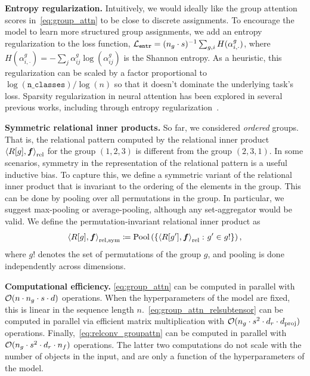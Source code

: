 \textbf{Entropy regularization.} Intuitively, we would ideally like the group attention scores in~\cref{eq:group_attn} to be close to discrete assignments. 
To encourage the model to learn more structured group assignments, we add an entropy regularization to the loss function, ${\mathcal{L}}_{\mathtt{entr}} = (n_g \cdot s)^{-1} \sum_{g, i} H(\alpha_{i,\cdot}^{g})$, where $H(\alpha_{i,\cdot}^{g}) = - \sum_{j} \alpha_{ij}^{g} \log(\alpha_{ij}^g)$ is the Shannon entropy. As a heuristic, this regularization can be scaled by a factor proportional to $\log(\mathtt{n\_classes}) / \log(n)$ so that it doesn't dominate the underlying task's loss. Sparsity regularization in neural attention has been explored in several previous works, including through entropy regularization~\citep[e.g.,][]{niculae2017regularized,martins2020sparse,attanasio2022entropy}.

\textbf{Symmetric relational inner products.} So far, we considered \textit{ordered} groups. That is, the relational pattern computed by the relational inner product $\left\langle R[g], \bm{f} \right\rangle_\mathrm{rel}$ for the group $(1, 2, 3)$ is different from the group $(2, 3, 1)$. In some scenarios, symmetry in the representation of the relational pattern is a useful inductive bias. To capture this, we define a symmetric variant of the relational inner product that is invariant to the ordering of the elements in the group. This can be done by pooling over all permutations in the group. In particular, we suggest max-pooling or average-pooling, although any set-aggregator would be valid. We define the permutation-invariant relational inner product as
\begin{equation}\label{eq:symmetric_relational_inner_prod}
    \left \langle R[g], \bm{f} \right\rangle_{\mathrm{rel}, \mathrm{sym}} \coloneq \mathrm{Pool}\left(\left\{\left\langle R[g'], \bm{f} \right\rangle_\mathrm{rel} \colon g' \in g!\right\}\right),
\end{equation}
where $g!$ denotes the set of permutations of the group $g$, and pooling is done independently across dimensions.


\textbf{Computational efficiency.} \cref{eq:group_attn} can be computed in parallel with ${\mathcal{O}}(n \cdot n_g \cdot s \cdot d)$ operations. When the hyperparameters of the model are fixed, this is linear in the sequence length $n$.~\cref{eq:group_attn_relsubtensor} can be computed in parallel via efficient matrix multiplication with ${\mathcal{O}}(n_g \cdot s^2 \cdot d_r \cdot d_{\mathrm{proj}})$ operations. Finally,~\cref{eq:relconv_groupattn} can be computed in parallel with ${\mathcal{O}}(n_g \cdot s^2 \cdot d_r \cdot n_f)$ operations. The latter two computations do not scale with the number of objects in the input, and are only a function of the hyperparameters of the model.


